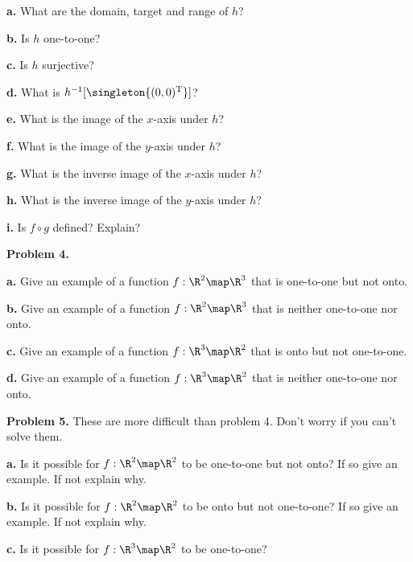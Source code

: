 \documentclass[oneside,12pt]{amsart}
\begin{document}
\smallskip

\textbf{a.}  What are the domain, target and range of $h$?

\medskip

\textbf{b.} Is $h$ one-to-one?

\medskip

\textbf{c.} Is $h$ surjective?

\medskip

\textbf{d.} What is $h^{-1}[\singleton{(0,0)^{\text{T}}}]$?

\medskip

\textbf{e.} What is the image of the $x$-axis under $h$?

\medskip

\textbf{f.} What is the image of the $y$-axis under $h$?

\medskip

\textbf{g.} What is the inverse image of the $x$-axis under $h$?

\medskip

\textbf{h.} What is the inverse image of the $y$-axis under $h$?

\medskip

\textbf{i.} Is $f \circ g$ defined? Explain?

\bigskip

\textbf{Problem 4.}
\smallskip

\textbf{a.} Give an example of a function $f:\R^2\map\R^3$ that is
one-to-one but not onto.

\bigskip

\textbf{b.} Give an example of a function $f:\R^2\map\R^3$ that is neither
one-to-one nor onto.

\bigskip

\textbf{c.} Give an example of a function $f:\R^3\map\R^2$ that is
onto but not one-to-one.

\bigskip

\textbf{d.} Give an example of a function $f:\R^3\map\R^2$ that is neither
one-to-one nor onto.


\bigskip

\textbf{Problem 5.} These are more difficult than problem 4. Don't worry
if you can't solve them.
\smallskip

\textbf{a.} Is it possible for $f:\R^2\map\R^2$ to be one-to-one but not onto?
If so give an example. If not explain why.

\bigskip

\textbf{b.} Is it possible for $f:\R^2\map\R^2$ to be onto but not one-to-one?
If so give an example. If not explain why.

\bigskip

\textbf{c.} Is it possible for $f:\R^3\map\R^2$ to be one-to-one?
\end{document}
